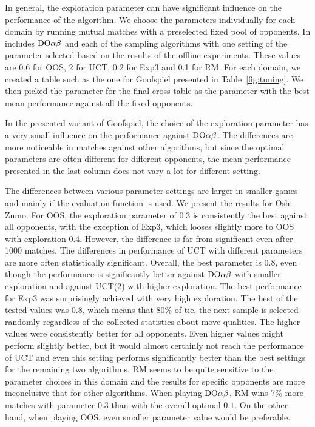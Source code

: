In general, the exploration parameter can have significant influence on the performance of the algorithm.
We choose the parameters individually for each domain by running mutual matches with a preselected fixed pool of opponents.
In includes $\textrm{DO}\alpha\beta$ and each of the sampling algorithms with one setting of the parameter selected based on the results of the offline experiments.
These values are 0.6 for OOS, 2 for UCT, 0.2 for Exp3 and 0.1 for RM.
For each domain, we created a table such as the one for Goofspiel presented in Table~\ref{fig:tuning}.
We then picked the parameter for the final cross table as the parameter with the best mean performance against all the fixed opponents.

In the presented variant of Goofspiel, the choice of the exploration parameter has a very small influence on the performance against $\textrm{DO}\alpha\beta$.
The differences are more noticeable in matches against other algorithms, but since the optimal parameters are often different for different opponents, the mean performance presented in the last column does not vary a lot for different setting.

The differences between various parameter settings are larger in smaller games and mainly if the evaluation function is used.
We present the results for Oshi Zumo.
For OOS, the exploration parameter of $0.3$ is consistently the best against all opponents, with the exception of Exp3, which looses slightly more to OOS with exploration 0.4.
However, the difference is far from significant even after 1000 matches.
The differences in performance of UCT with different parameters are more often statistically significant.
Overall, the best parameter is 0.8, even though the performance is significantly better against $\textrm{DO}\alpha\beta$ with smaller exploration and against UCT(2) with higher exploration.
The best performance for Exp3 was surprisingly achieved with very high exploration. The best of the tested values was 0.8, which means that 80\% of tie, the next sample is selected randomly regardless of the collected statistics about move qualities.
The higher values were consistently better for all opponents. Even higher values might perform slightly better, but it would almost certainly not reach the performance of UCT and even this setting performs significantly better than the best settings for the remaining two algorithms.
RM seems to be quite sensitive to the parameter choices in this domain and the results for specific opponents are more inconclusive that for other algorithms.
When playing $\textrm{DO}\alpha\beta$, RM wins 7\% more  matches with parameter $0.3$ than with the overall optimal $0.1$.
On the other hand, when playing OOS, even smaller parameter value would be preferable.

